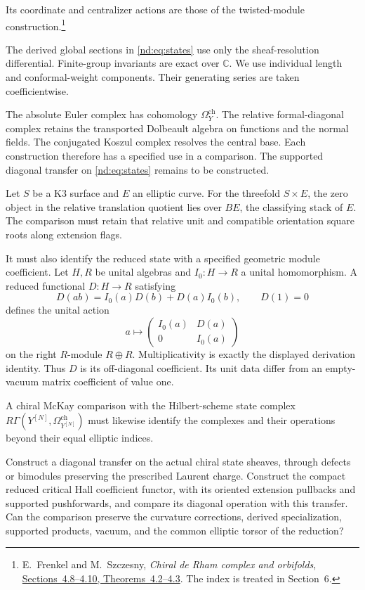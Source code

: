 Its coordinate and centralizer actions are those of the
twisted-module construction.\footnote{
E.~Frenkel and M.~Szczesny, \emph{Chiral de Rham complex and orbifolds},
\href{https://arxiv.org/abs/math/0307181}{Sections~4.8--4.10,
Theorems~4.2--4.3}. The index is treated in Section~6.}

The derived global sections in \eqref{nd:eq:states} use only the
sheaf-resolution differential. Finite-group invariants are exact
over $\mathbb C$. We use individual length and conformal-weight
components. Their generating series are taken coefficientwise.

The absolute Euler complex has cohomology $\Omega_Y^{\mathrm{ch}}$.
The relative formal-diagonal complex retains the transported
Dolbeault algebra on functions and the normal fields.
The conjugated Koszul complex resolves the central base.
Each construction therefore has a specified use in a comparison.
The supported diagonal transfer on
\eqref{nd:eq:states} remains to be constructed.

Let $S$ be a K3 surface and $E$ an elliptic curve. For the threefold
$S\times E$, the zero object in the relative translation quotient
lies over $BE$, the classifying stack of $E$.
The comparison must retain that relative unit and compatible
orientation square roots along extension flags.

It must also identify the reduced state with a specified geometric
module coefficient. Let $H,R$ be unital algebras and
$I_0:H\to R$ a unital homomorphism. A reduced functional
$D:H\to R$ satisfying
\[
 D(ab)=I_0(a)D(b)+D(a)I_0(b),\qquad D(1)=0
\]
defines the unital action
\[
 a\longmapsto\begin{pmatrix}I_0(a)&D(a)\\0&I_0(a)\end{pmatrix}
\]
on the right $R$-module $R\oplus R$. Multiplicativity is exactly the
displayed derivation identity. Thus $D$ is its off-diagonal coefficient. Its unit data differ from an
empty-vacuum matrix coefficient of value one.

A chiral McKay comparison with the Hilbert-scheme state complex
$R\Gamma(Y^{[N]},\Omega_{Y^{[N]}}^{\mathrm{ch}})$ must likewise identify
the complexes and their operations beyond their equal elliptic indices.

\begin{question}\label{nd:qn:transfer}
Construct a diagonal transfer on the actual chiral state sheaves,
through defects or bimodules preserving the prescribed Laurent charge.
Construct the compact reduced critical Hall coefficient functor,
with its oriented extension pullbacks and supported pushforwards,
and compare its diagonal operation with this transfer.
Can the comparison preserve the curvature corrections, derived
specialization, supported products, vacuum, and the common elliptic
torsor of the reduction?
\end{question}


